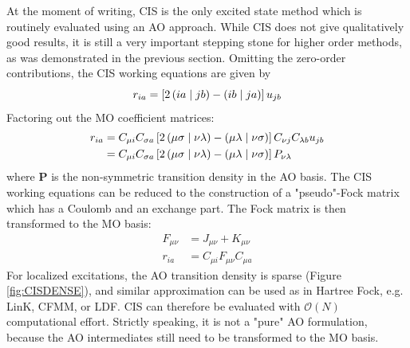At the moment of writing, CIS is the only excited state method which is routinely evaluated using an AO approach. While CIS does not give qualitatively good results, it is still a very important stepping stone for higher order methods, as was demonstrated in the previous section. Omitting the zero-order contributions, the CIS working equations are given by
\begin{equation}
r_{ia} = \left[ 2 \left( ia \mid jb \right) - \left( ib \mid ja \right) \right] u_{jb}
\end{equation}
\noindent Factoring out the MO coefficient matrices:
\begin{equation}
\begin{split}
r_{ia} &= C_{\mu i} C_{\sigma a} \left[ 2 \left( \mu\sigma \mid \nu\lambda \right) - \left( \mu\lambda \mid \nu\sigma \right) \right] C_{\nu j} C_{\lambda b} u_{jb} \\ 
&= C_{\mu i} C_{\sigma a} \left[ 2 \left( \mu\sigma \mid \nu\lambda \right) - \left( \mu\lambda \mid \nu\sigma \right) \right] P_{\nu\lambda} 
\end{split}
\end{equation} 
\noindent where $\mathbf{P}$ is the non-symmetric transition density in the AO basis. The CIS working equations can be reduced to the construction of a "pseudo"-Fock matrix which has a Coulomb and an exchange part. The Fock matrix is then transformed to the MO basis:
\begin{align}
F_{\mu\nu} &= J_{\mu\nu} + K_{\mu\nu}  \\ 
r_{ia} &= C_{\mu i} F_{\mu\nu} C_{\mu a}  
\end{align}
\noindent For localized excitations, the AO transition density is sparse (Figure \ref{fig:CISDENSE}), and similar approximation can be used as in Hartree Fock, e.g. LinK, CFMM, or LDF. CIS can therefore be evaluated with $\mathcal{O}(N)$ computational effort. Strictly speaking, it is not a "pure" AO formulation, because the AO intermediates still need to be transformed to the MO basis.

